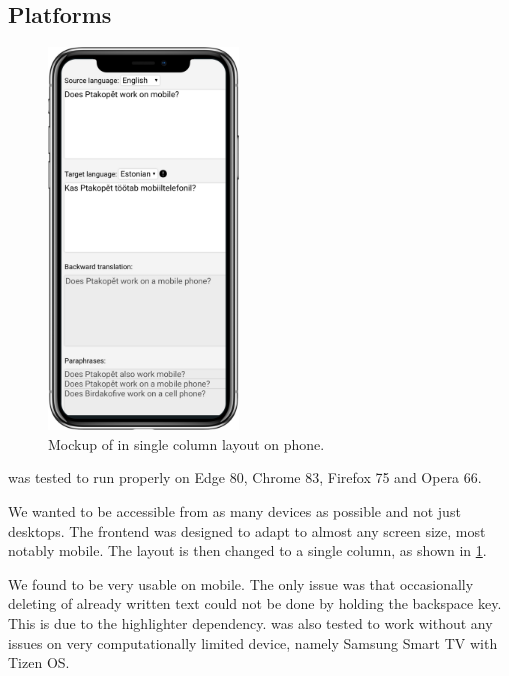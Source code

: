 \subsection*{Platforms}

\begin{figure}[ht]
  \centering
  \includegraphics[width=0.45\textwidth]{img/usage/usage-mobile-mockup.png}
  \caption{\label{fig:usage-mobile} Mockup of \ptakopet{} in single column layout on phone.}
\end{figure}

\ptakopet{} was tested to run properly on Edge 80, Chrome 83, Firefox 75 and Opera 66.

We wanted \ptakopet{} to be accessible from as many devices as possible and not just desktops. The frontend was designed to adapt to almost any screen size, most notably mobile. The layout is then changed to a single column, as shown in \cref{fig:usage-mobile}.

We found \ptakopet{} to be very usable on mobile. The only issue was that occasionally deleting of already written text could not be done by holding the backspace key. This is due to the highlighter dependency. \ptakopet{} was also tested to work without any issues on very computationally limited device, namely Samsung Smart TV with Tizen OS.